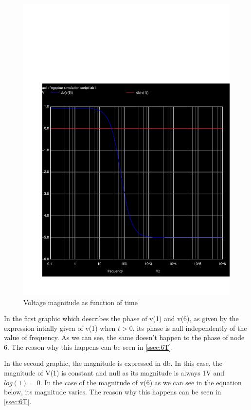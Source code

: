 \begin{figure}[h!] \centering
\includegraphics[width=0.45\linewidth]{teste_5_db.pdf}
\caption{Voltage magnitude as function of time}
\label{fig:db(v(1)) db(v(6))}
\end{figure}

\par In the first graphic which describes the phase of v(1) and v(6), as given by the expression intially given of v(1) when $t>0$, its phase is null independently of the value of frequency.  As we can see, the same doesn't happen to the phase of node 6. The reason why this happens can be seen in \ref{ssec:6T}.

\par In the second graphic, the magnitude is expressed in db. In this case, the magnitude of V(1) is constant and null as its magnitude is always 1V and $log(1)=0$. In the case of the magnitude of v(6) as we can see in the equation below, its magnitude varies. The reason why this happens can be seen in \ref{ssec:6T}. 

\newpage
 
